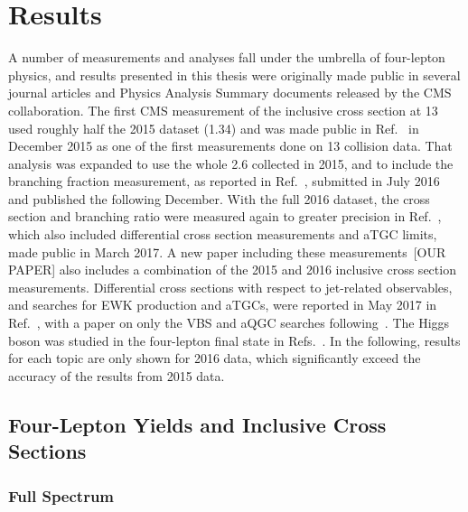 
\chapter{Results}\label{ch:results}

A number of measurements and analyses fall under the umbrella of four-lepton physics, and results presented in this thesis were originally made public in several journal articles and Physics Analysis Summary documents released by the CMS collaboration.
The first CMS measurement of the {\ZZ} inclusive cross section at {13\TeV} used roughly half the 2015 dataset ({1.34\fbinv}) and was made public in Ref.~\cite{CMS:2015fnj} in December 2015 as one of the first measurements done on {13\TeV} collision data.
That analysis was expanded to use the whole {2.6\fbinv} collected in 2015, and to include the {\Zfourl} branching fraction measurement, as reported in Ref.~\cite{Khachatryan:2016txa}, submitted in July 2016 and published the following December.
With the full 2016 dataset, the {\ZZ} cross section and {\Zfourl} branching ratio were measured again to greater precision in Ref.~\cite{CMS:2017ruh}, which also included differential cross section measurements and aTGC limits, made public in March 2017.
A new paper including these measurements~[OUR PAPER] also includes a combination of the 2015 and 2016 inclusive cross section measurements. %
Differential cross sections with respect to jet-related observables, and searches for EWK {\ZZ} production and aTGCs, were reported in May 2017 in Ref.~\cite{CMS:2017dyw}, with a paper on only the VBS and aQGC searches following~\cite{Sirunyan:2017fvv}.
The Higgs boson was studied in the four-lepton final state in Refs.~\cite{CMS:2016rqf,CMS:2016ilx,Sirunyan:2017exp}.
In the following, results for each topic are only shown for 2016 data, which significantly exceed the accuracy of the results from 2015 data.



\section{Four-Lepton Yields and Inclusive Cross Sections}


\subsection{Full Spectrum}

